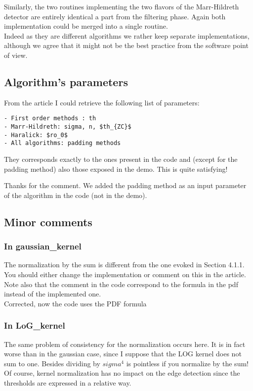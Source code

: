 \documentclass[a4paper,10pt]{report}
\begin{document}
Similarly, the two routines implementing the two flavors of the Marr-Hildreth
detector are entirely identical a part from the filtering phase. Again both
implementation could be merged into a single routine.\\

\ans Indeed as they are different algorithms we rather keep separate implementations, although we agree that it might not be the best practice from the software point of view.\\

\subsection{ Algorithm's parameters}
\que From the article I could retrieve the following list of parameters:
\begin{verbatim}
- First order methods : th
- Marr-Hildreth: sigma, n, $th_{ZC}$
- Haralick: $ro_0$
- All algorithms: padding methods
\end{verbatim}
They corresponds exactly to the ones present in the code and (except for the
padding method) also those exposed in the demo. This is quite satisfying!

\ans Thanks for the comment. We added the padding method as an input parameter of the algorithm in the code (not in the demo).\\

\subsection{ Minor comments}
\subsubsection{ In gaussian\_kernel}
\que The normalization by the sum is different from the one evoked in Section
4.1.1. You should either change the implementation or comment on this in the article. Note
also that the comment in the code correspond to the formula in the pdf instead of the implemented one.\\

\ans Corrected, now  the code uses the PDF formula\\


\subsubsection{ In LoG\_kernel }
The same problem of consistency for the normalization occurs here. It is in
fact worse than in the gaussian case, since I suppose that the LOG kernel does not sum to one. Besides dividing by $sigma^4$ is pointless if you normalize by the sum! Of course, kernel normalization has no impact on the edge detection since the thresholds are expressed in a relative way.
\end{document}
